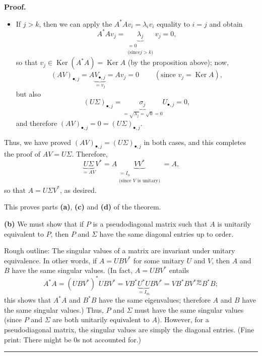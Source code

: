 \documentclass[numbers=enddot,12pt,final,onecolumn,notitlepage]{scrartcl}%
\numberwithin{exer}{subsection}
\theoremstyle{definition}
\newenvironment{proof}[1][Proof]{\noindent\textbf{#1.} }{\ \rule{0.5em}{0.5em}}
\begin{document}
\begin{proof}
\begin{itemize}
\item If $j>k$, then we can apply the $A^{\ast}Av_{i}=\lambda_{i}v_{i}$
equality to $i=j$ and obtain%
\[
A^{\ast}Av_{j}=\underbrace{\lambda_{j}}_{\substack{=0\\\text{(since
}j>k\text{)}}}v_{j}=0,
\]
so that $v_{j}\in\operatorname*{Ker}\left(  A^{\ast}A\right)
=\operatorname*{Ker}A$ (by the proposition above); now,%
\[
\left(  AV\right)  _{\bullet,j}=A\underbrace{V_{\bullet,j}}_{=v_{j}}%
=Av_{j}=0\ \ \ \ \ \ \ \ \ \ \left(  \text{since }v_{j}=\operatorname*{Ker}%
A\right)  ,
\]
but also%
\[
\left(  U\Sigma\right)  _{\bullet,j}=\underbrace{\sigma_{j}}_{=\sqrt
{\lambda_{j}}=\sqrt{0}=0}U_{\bullet,j}=0,
\]
and therefore $\left(  AV\right)  _{\bullet,j}=0=\left(  U\Sigma\right)
_{\bullet,j}$.
\end{itemize}

Thus, we have proved $\left(  AV\right)  _{\bullet,j}=\left(  U\Sigma\right)
_{\bullet,j}$ in both cases, and this completes the proof of $AV=U\Sigma$.
Therefore,%
\[
\underbrace{U\Sigma}_{=AV}V^{\ast}=A\underbrace{VV^{\ast}}_{\substack{=I_{n}%
\\\text{(since }V\text{ is unitary)}}}=A,
\]
so that $A=U\Sigma V^{\ast}$, as desired.

This proves parts \textbf{(a)}, \textbf{(c)} and \textbf{(d)} of the theorem.

\textbf{(b)} We must show that if $P$ is a pseudodiagonal matrix such that $A$
is unitarily equivalent to $P$, then $P$ and $\Sigma$ have the same diagonal
entries up to order.

Rough outline: The singular values of a matrix are invariant under unitary
equivalence. In other words, if $A=UBV^{\ast}$ for some unitary $U$ and $V$,
then $A$ and $B$ have the same singular values. (In fact, $A=UBV^{\ast}$
entails%
\[
A^{\ast}A=\left(  UBV^{\ast}\right)  ^{\ast}UBV^{\ast}=VB^{\ast}%
\underbrace{U^{\ast}U}_{=I_{m}}BV^{\ast}=VB^{\ast}BV^{\ast}%
\overset{\operatorname*{us}}{\sim}B^{\ast}B;
\]
this shows that $A^{\ast}A$ and $B^{\ast}B$ have the same eigenvalues;
therefore $A$ and $B$ have the same singular values.) Thus, $P$ and $\Sigma$
must have the same singular values (since $P$ and $\Sigma$ are both unitarily
equivalent to $A$). However, for a pseudodiagonal matrix, the singular values
are simply the diagonal entries. (Fine print: There might be $0$s not
accounted for.)
\end{proof}
\end{document}
